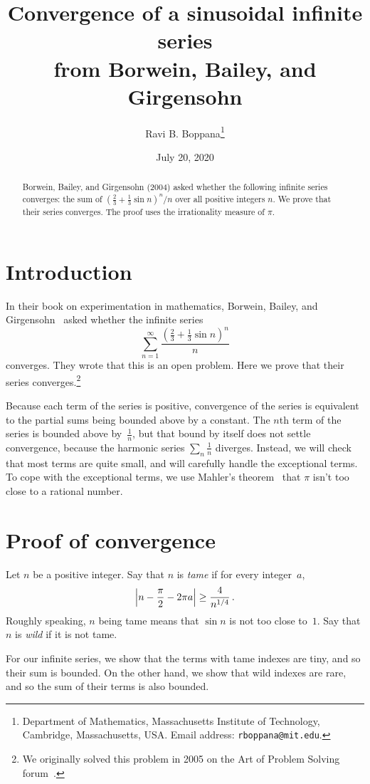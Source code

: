\documentclass[12pt]{article}
\title{Convergence of a sinusoidal infinite series\\
       from Borwein, Bailey, and Girgensohn}
\author{Ravi B. Boppana\thanks{Department of Mathematics, Massachusetts Institute of Technology, Cambridge, Massachusetts, USA\@.  Email address: {\tt rboppana@mit.edu}.}
}
\date{July 20, 2020}
\theoremstyle{plain}
\DeclarePairedDelimiter\abs{\lvert}{\rvert}
\begin{document}
\maketitle

\begin{abstract}
Borwein, Bailey, and Girgensohn (2004) asked whether the following infinite series converges: 
the sum of $(\frac{2}{3} + \frac{1}{3} \sin n)^n / n$ over all positive integers $n$.
We prove that their series converges.
The proof uses the irrationality measure of $\pi$.  
\end{abstract}  

\section{Introduction}

In their book on experimentation in mathematics, 
Borwein, Bailey, and Girgensohn~\cite[page~56]{BBG} asked whether the infinite series
\[
  \sum_{n=1}^\infty \frac{(\frac{2}{3} + \frac{1}{3} \sin n)^n}{n}
\]
converges.  
They wrote that this is an open problem.  
Here we prove that their series converges.\footnote{We originally solved this problem in 2005 on the Art of Problem Solving forum~\cite{AoPS}.}  

Because each term of the series is positive, 
convergence of the series is equivalent to the partial sums being bounded above by a constant.
The $n$th term of the series is bounded above by~$\frac{1}{n}$,
but that bound by itself does not settle convergence,
because the harmonic series $\sum_n \frac{1}{n}$ diverges.  
Instead, we will check that most terms are quite small, 
and will carefully handle the exceptional terms. 
To cope with the exceptional terms, 
we use Mahler's theorem~\cite{Mahler} that $\pi$ isn't too close to a rational number.   

\section{Proof of convergence}

Let $n$ be a positive integer.  
Say that $n$ is \emph{tame} if for every integer~$a$,
\[
  \abs[\Big]{ n - \frac{\pi}{2} - 2 \pi a } \geq \frac{4}{n^{1/4}} \, .
\]
Roughly speaking, $n$ being tame means that $\sin n$ is not too close to~$1$.
Say that $n$ is \emph{wild} if it is not tame.

For our infinite series, we show that the terms with tame indexes are tiny, 
and so their sum is bounded.  
On the other hand, we show that wild indexes are rare, 
and so the sum of their terms is also bounded.  
\end{document}

